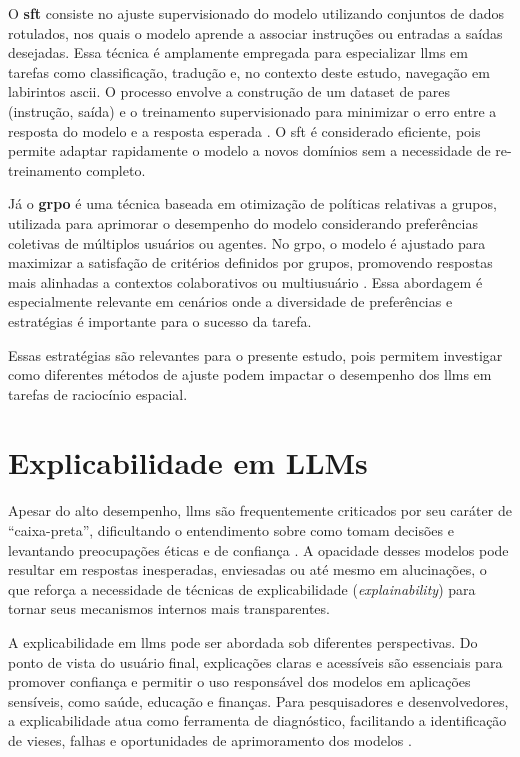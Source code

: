 O \textbf{\gls{sft}} consiste no ajuste supervisionado do modelo utilizando conjuntos de dados rotulados, nos quais o modelo aprende a associar instruções ou entradas a saídas desejadas. Essa técnica é amplamente empregada para especializar \gls{llms} em tarefas como classificação, tradução e, no contexto deste estudo, navegação em labirintos \gls{ascii}. O processo envolve a construção de um dataset de pares (instrução, saída) e o treinamento supervisionado para minimizar o erro entre a resposta do modelo e a resposta esperada \cite{zhang2024instructiontuning}. O \gls{sft} é considerado eficiente, pois permite adaptar rapidamente o modelo a novos domínios sem a necessidade de re-treinamento completo.

Já o \textbf{\gls{grpo}} é uma técnica baseada em otimização de políticas relativas a grupos, utilizada para aprimorar o desempenho do modelo considerando preferências coletivas de múltiplos usuários ou agentes. No \gls{grpo}, o modelo é ajustado para maximizar a satisfação de critérios definidos por grupos, promovendo respostas mais alinhadas a contextos colaborativos ou multiusuário \cite{dao2025alphamaze}. Essa abordagem é especialmente relevante em cenários onde a diversidade de preferências e estratégias é importante para o sucesso da tarefa.

Essas estratégias são relevantes para o presente estudo, pois permitem investigar como diferentes métodos de ajuste podem impactar o desempenho dos \gls{llms} em tarefas de raciocínio espacial.

\section{Explicabilidade em LLMs}

Apesar do alto desempenho, \gls{llms} são frequentemente criticados por seu caráter de “caixa-preta”, dificultando o entendimento sobre como tomam decisões e levantando preocupações éticas e de confiança \cite{zhao2023explainability, cambria2024xai, luo2024fromunderstanding}. A opacidade desses modelos pode resultar em respostas inesperadas, enviesadas ou até mesmo em alucinações, o que reforça a necessidade de técnicas de explicabilidade (\textit{explainability}) para tornar seus mecanismos internos mais transparentes.

A explicabilidade em \gls{llms} pode ser abordada sob diferentes perspectivas. Do ponto de vista do usuário final, explicações claras e acessíveis são essenciais para promover confiança e permitir o uso responsável dos modelos em aplicações sensíveis, como saúde, educação e finanças. Para pesquisadores e desenvolvedores, a explicabilidade atua como ferramenta de diagnóstico, facilitando a identificação de vieses, falhas e oportunidades de aprimoramento dos modelos \cite{zhao2023explainability, luo2024fromunderstanding}.

